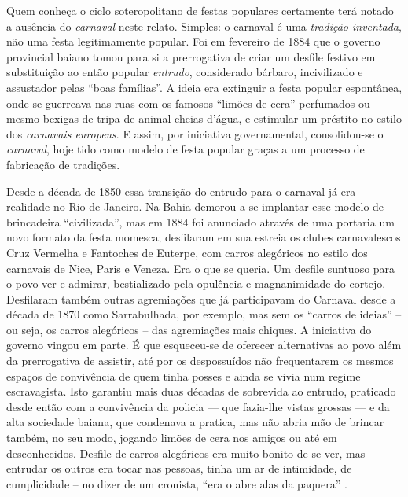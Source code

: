 Quem conheça o ciclo soteropolitano de festas populares certamente terá notado a ausência do \textit{carnaval} neste relato. Simples: o carnaval é uma \textit{tradição inventada}, não uma festa legitimamente popular. Foi em fevereiro de 1884 que o governo provincial baiano tomou para si a prerrogativa de criar um desfile festivo em substituição ao então popular \textit{entrudo}, considerado bárbaro, incivilizado e assustador pelas ``boas famílias''. A ideia era extinguir a festa popular espontânea, onde se guerreava nas ruas com os famosos ``limões de cera'' perfumados ou mesmo bexigas de tripa de animal cheias d'água, e estimular um préstito no estilo dos \textit{carnavais europeus}. E assim, por iniciativa governamental, consolidou-se o \textit{carnaval}, hoje tido como modelo de festa popular graças a um processo de fabricação de tradições.

Desde a década de 1850 essa transição do entrudo para o carnaval já era realidade no Rio de Janeiro. Na Bahia demorou a se implantar esse modelo de brincadeira ``civilizada'', mas em 1884 foi anunciado através de uma portaria um novo formato da festa momesca; desfilaram em sua estreia os clubes carnavalescos Cruz Vermelha e Fantoches de Euterpe, com carros alegóricos no estilo dos carnavais de Nice, Paris e Veneza. Era o que se queria. Um desfile suntuoso para o povo ver e admirar, bestializado pela opulência e magnanimidade do cortejo. Desfilaram também outras agremiações que já participavam do Carnaval desde a década de 1870 como Sarrabulhada, por exemplo, mas sem os ``carros de ideias'' -- ou seja, os carros alegóricos -- das agremiações mais chiques. A iniciativa do governo vingou em parte. É que esqueceu-se de oferecer alternativas ao povo além da prerrogativa de assistir, até por os despossuídos não frequentarem os mesmos espaços de convivência de quem tinha posses e ainda se vivia num regime escravagista. Isto garantiu mais duas décadas de sobrevida ao entrudo, praticado desde então com a convivência da policia --- que fazia-lhe vistas grossas --- e da alta sociedade baiana, que condenava a pratica, mas não abria mão de brincar também, no seu modo, jogando limões de cera nos amigos ou até em desconhecidos. Desfile de carros alegóricos era muito bonito de se ver, mas entrudar os outros era tocar nas pessoas, tinha um ar de intimidade, de cumplicidade -- no dizer de um cronista, ``era o abre alas da paquera'' \cite{cadena_130carnaval_2017}.

